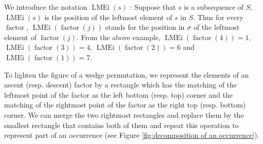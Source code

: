\documentclass[a4paper]{llncs}
\DeclareMathOperator{\LMEi}{LMEi}
\DeclareMathOperator{\factor}{factor}
\begin{document}
We introduce the notation $\LMEi(s)$ : Suppose that $s$ is a subsequence of $S$, $\LMEi(s)$ is the position of the leftmost element of $s$ in $S$. Thus
for every $\factor$, $\LMEi(\factor(j))$ stands for the position in $\sigma$
of the leftmost element of $\factor(j)$.
From the above example,
$\LMEi(\factor(4)) = 1$, $\LMEi(\factor(3)) = 4$, $\LMEi(\factor(2)) = 6$ and $\LMEi(\factor(1)) = 7$.

To lighten the figure of a wedge permutation, 
we represent the elements of an ascent (resp. descent) factor 
by a rectangle which has the matching of the leftmost point of the factor as the left bottom (resp. top) corner and the matching of the rightmost point of the factor as the right top (resp. bottom) corner.
We can merge the two rightmost rectangles and replace them by the smallest rectangle that contains both of them and repeat this operation to represent part of an occurrence (see Figure \ref{fig:decomposition of an occurrence}).
\end{document}
